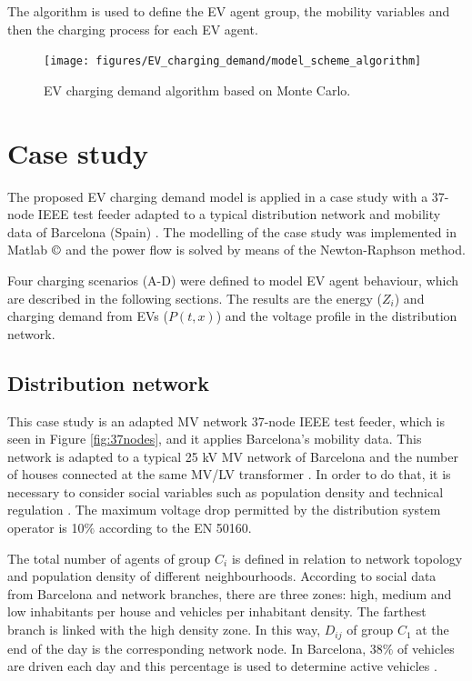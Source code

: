 \documentclass[a4paper,11pt,twoside,openright]{report}
\begin{document}
The algorithm is used to define the EV agent group, the mobility variables and then the charging process for each EV agent. 

\begin{figure}[h!]
	\centering
	\texttt{[image: figures/EV\_charging\_demand/model\_scheme\_algorithm]} 
	\caption{EV charging demand algorithm based on Monte Carlo. 
		\label{fig:ev_abm_scheme_alg}}
\end{figure}

\section{Case study}
\label{sec:Case_study}

The proposed EV charging demand model is applied in a case study with a 37-node IEEE test feeder adapted to a typical distribution network and mobility data of Barcelona (Spain) \cite{EMQ2006}. The modelling of the case study was implemented in Matlab $\copyright$ and the power flow is solved by means of the Newton-Raphson method.

Four charging scenarios (A-D) were defined to model EV agent behaviour, which are described in the following sections. The results are the energy ($Z_{i}$) and charging demand from EVs ($P(t,x)$) and the voltage profile in the distribution network.

\subsection{Distribution network} \label{network}

This case study is an adapted MV network 37-node IEEE test feeder, which is seen in Figure \ref{fig:37nodes}, and it applies Barcelona's mobility data. This network is adapted to a typical 25 kV MV network of Barcelona and the number of houses connected at the same MV/LV transformer \cite{Valsera2012}. In order to do that, it is necessary to consider social variables such as population density and technical regulation \cite{ITC-BT-10}. 
The maximum voltage drop permitted by the distribution system operator is 10$\%$ according to the EN 50160.

The total number of agents of group $C_{i}$ is defined in relation to network topology and population density of different neighbourhoods. According to social data from Barcelona and network branches, there are three zones: high, medium and low inhabitants per house and vehicles per inhabitant density. The farthest branch is linked with the high density zone. In this way, $D_{ij}$ of group $C_{1}$ at the end of the day is the corresponding network node.
In Barcelona, 38$\%$ of vehicles are driven each day and this percentage is used to determine active vehicles \cite{EMQ2006}.
\end{document}
